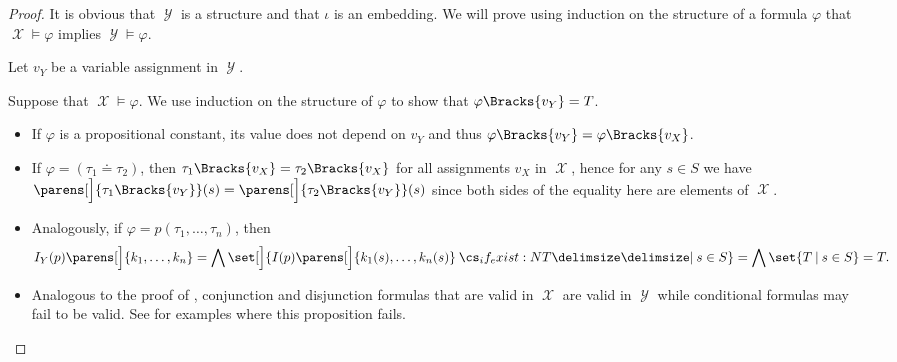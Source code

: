 \begin{proof}
  It is obvious that \( \mscrY \) is a structure and that \( \iota \) is an embedding. We will prove using induction on the structure of a formula \( \varphi \) that \( \mscrX \vDash \varphi \) implies \( \mscrY \vDash \varphi \).

  Let \( v_Y \) be a variable assignment in \( \mscrY \).

  Suppose that \( \mscrX \vDash \varphi \). We use induction on the structure of \( \varphi \) to show that \( \varphi\Bracks{v_Y} = T \).
  \begin{itemize}
    \item If \( \varphi \) is a propositional constant, its value does not depend on \( v_Y \) and thus \( \varphi\Bracks{v_Y} = \varphi\Bracks{v_X} \).

    \item If \( \varphi = (\tau_1 \doteq \tau_2) \), then \( \tau_1\Bracks{v_X} = \tau_2\Bracks{v_X} \) for all assignments \( v_X \) in \( \mscrX \), hence for any \( s \in S \) we have \( \parens[\Big]{\tau_1\Bracks{v_Y}}(s) = \parens[\Big]{\tau_2\Bracks{v_Y}}(s) \) since both sides of the equality here are elements of \( \mscrX \).

    \item Analogously, if \( \varphi = p(\tau_1, \ldots, \tau_n) \), then
    \begin{equation*}
      I_Y(p) \parens[\Big]{ k_1, \ldots, k_n }
      =
      \bigwedge \set[\Big]{ I(p) \parens[\Big]{ k_1(s), \ldots, k_n(s) } \given* s \in S }
      =
      \bigwedge \set{ T \given s \in S }
      =
      T.
    \end{equation*}

    \item Analogous to the proof of , conjunction and disjunction formulas that are valid in \( \mscrX \) are valid in \( \mscrY \) while conditional formulas may fail to be valid. See  for examples where this proposition fails.
  \end{itemize}
\end{proof}

